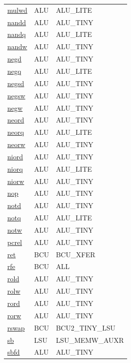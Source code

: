 \begin{small}
\begin{longtable}[l]{l l l}
\hyperlink{lvx.mulwd}{mulwd} & ALU & ALU\_LITE \\ 
\hyperlink{lvx.nandd}{nandd} & ALU & ALU\_TINY \\ 
\hyperlink{lvx.nandq}{nandq} & ALU & ALU\_LITE \\ 
\hyperlink{lvx.nandw}{nandw} & ALU & ALU\_TINY \\ 
\hyperlink{lvx.negd}{negd} & ALU & ALU\_TINY \\ 
\hyperlink{lvx.negq}{negq} & ALU & ALU\_LITE \\ 
\hyperlink{lvx.negsd}{negsd} & ALU & ALU\_TINY \\ 
\hyperlink{lvx.negsw}{negsw} & ALU & ALU\_TINY \\ 
\hyperlink{lvx.negw}{negw} & ALU & ALU\_TINY \\ 
\hyperlink{lvx.neord}{neord} & ALU & ALU\_TINY \\ 
\hyperlink{lvx.neorq}{neorq} & ALU & ALU\_LITE \\ 
\hyperlink{lvx.neorw}{neorw} & ALU & ALU\_TINY \\ 
\hyperlink{lvx.niord}{niord} & ALU & ALU\_TINY \\ 
\hyperlink{lvx.niorq}{niorq} & ALU & ALU\_LITE \\ 
\hyperlink{lvx.niorw}{niorw} & ALU & ALU\_TINY \\ 
\hyperlink{lvx.nop}{nop} & ALU & ALU\_TINY \\ 
\hyperlink{lvx.notd}{notd} & ALU & ALU\_TINY \\ 
\hyperlink{lvx.notq}{notq} & ALU & ALU\_LITE \\ 
\hyperlink{lvx.notw}{notw} & ALU & ALU\_TINY \\ 
\hyperlink{lvx.pcrel}{pcrel} & ALU & ALU\_TINY \\ 
\hyperlink{lvx.ret}{ret} & BCU & BCU\_XFER \\ 
\hyperlink{lvx.rfe}{rfe} & BCU & ALL \\ 
\hyperlink{lvx.rold}{rold} & ALU & ALU\_TINY \\ 
\hyperlink{lvx.rolw}{rolw} & ALU & ALU\_TINY \\ 
\hyperlink{lvx.rord}{rord} & ALU & ALU\_TINY \\ 
\hyperlink{lvx.rorw}{rorw} & ALU & ALU\_TINY \\ 
\hyperlink{lvx.rswap}{rswap} & BCU & BCU2\_TINY\_LSU \\ 
\hyperlink{lvx.sb}{sb} & LSU & LSU\_MEMW\_AUXR \\ 
\hyperlink{lvx.sbfd}{sbfd} & ALU & ALU\_TINY \\ 

\end{longtable}
\end{small}
